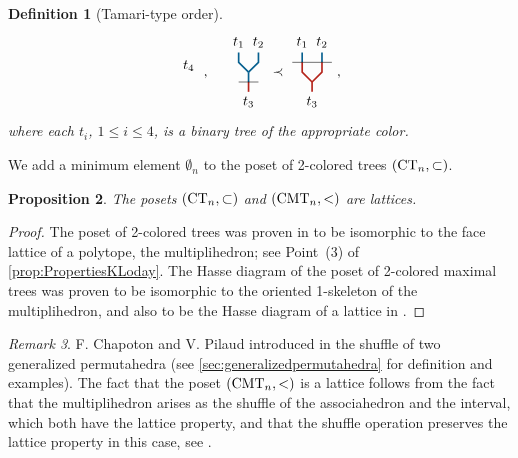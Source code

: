 \documentclass[twoside, 11pt]{amsart}
\newtheorem{definition}{Definition}[section]
\newtheorem{proposition}[definition]{Proposition}
\theoremstyle{remark}
\newtheorem{remark}[definition]{\sc Remark}
\begin{document}
\begin{definition}[Tamari-type order]
\[{{{\begin{tikzpicture}[yscale=0.5,xscale=0.5]
\draw (0,-0.5) node[below] {$t_4$}; 
\end{tikzpicture}}}}\ , \quad 
{\vcenter{\hbox{
\begin{tikzpicture}[yscale=0.5,xscale=0.5]
\draw[very thick, MidnightBlue] (0,0.5)--(0,1);
\draw[very thick, MidnightBlue] (0,1)--(-0.5,1.5)--(-0.5,2);
\draw[very thick, MidnightBlue] (0,1)--(0.5,1.5)--(0.5,2);
% 
\draw[very thick, BrickRed] (0,0)--(0,0.5);
\draw (-0.5,0.5) --(0.5, 0.5);
%
\draw (-0.5,2) node[above] {$t_1$}; 
\draw (0.5,2) node[above] {$t_2$}; 
\draw (0,0) node[below] {$t_3$}; 
\end{tikzpicture}}}}
\prec
{\vcenter{\hbox{
\begin{tikzpicture}[yscale=0.5,xscale=0.5]
\draw[very thick, MidnightBlue] (-0.5,2)--(-0.5,2.5);
\draw[very thick, MidnightBlue] (0.5,2)--(0.5,2.5);
%
\draw[very thick, BrickRed] (0,0.5)--(0,1);
\draw[very thick, BrickRed] (0,1)--(-0.5,1.5)--(-0.5,2);
\draw[very thick, BrickRed] (0,1)--(0.5,1.5)--(0.5,2);
% 
\draw (-1,2) --(1, 2);
%
\draw (-0.5,2.5) node[above] {$t_1$}; 
\draw (0.5,2.5) node[above] {$t_2$}; 
\draw (0,0.5) node[below] {$t_3$}; 
\end{tikzpicture}}}}
\ ,\]
where each $t_i$, $1\leq i\leq 4$, is a binary tree of the appropriate color. 
\end{definition}

We add a minimum element $\emptyset_n$ to the poset of 2-colored trees $(\mathrm{CT}_{n}, \subset)$. 

\begin{proposition}
The posets $(\mathrm{CT}_{n}, \subset)$ and $(\mathrm{CMT}_{n}, <)$ are lattices. 
\end{proposition}

\begin{proof}
The poset of 2-colored trees was proven in \cite{Forcey08} to be isomorphic to the face lattice of a polytope, the multiplihedron; see Point~(3) of \cref{prop:PropertiesKLoday}. 
The Hasse diagram of the poset of 2-colored maximal trees was proven to be isomorphic to the oriented 1-skeleton of the multiplihedron, and also to be the Hasse diagram of a lattice in \cite[Proposition 117]{CP22}.
\end{proof}

\begin{remark}
F. Chapoton and V. Pilaud introduced in \cite{CP22} the shuffle of two generalized permutahedra (see \cref{sec:generalizedpermutahedra} for definition and examples).
The fact that the poset $(\mathrm{CMT}_{n}, <)$ is a lattice follows from the fact that the multiplihedron arises as the shuffle of the associahedron and the interval, which both have the lattice property, and that the shuffle operation preserves the lattice property in this case, see \cite[Corollary 95]{CP22}. 
\end{remark}
\end{document}
